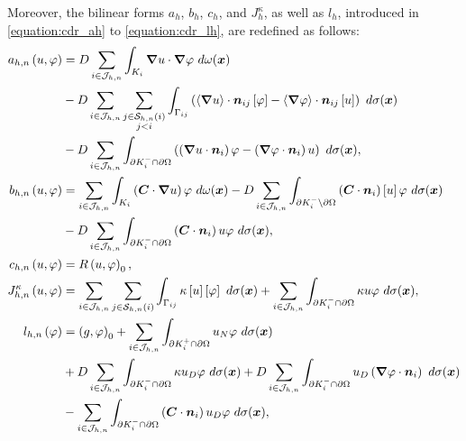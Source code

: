 Moreover, the bilinear forms $a_h$, $b_h$, $c_h$, and $J^{\kappa}_h$, as well as $l_h$, introduced in \eqref{equation:cdr_ah} to \eqref{equation:cdr_lh}, are redefined as follows:
\begin{align}
    a_{h, n} \left( u, \varphi \right) &= D \sum_{i \in \mathcal{J}_{h, n}} \int_{K_i} \bm{\nabla} u \cdot \bm{\nabla} \varphi ~ d \omega(\bm{x}) \label{equation:cdr_ahn} \\
    &- D \sum_{i \in \mathcal{J}_{h, n}} \sum_{\substack{j \in \mathcal{S}_{h, n}(i) \\ j < i}} \int_{\Gamma_{ij}} \left( \left\langle \bm{\nabla} u \right\rangle \cdot \bm{n}_{ij} \left[ \varphi \right] - \left\langle \bm{\nabla} \varphi \right\rangle \cdot \bm{n}_{ij} \left[ u \right] \right) ~ d \sigma(\bm{x}) \notag \\
    &- D \sum_{i \in \mathcal{J}_{h, n}} \int_{\partial K_i^- \cap \partial \Omega} \left( \left( \bm{\nabla} u \cdot \bm{n}_i \right) \varphi - \left( \bm{\nabla} \varphi \cdot \bm{n}_i \right) u \right) ~ d \sigma(\bm{x}), \notag \\
    b_{h, n} \left( u, \varphi \right) &= \sum_{i \in \mathcal{J}_{h, n}} \int_{K_i} \left( \bm{C} \cdot \bm{\nabla} u \right) \varphi ~ d \omega(\bm{x}) \label{equation:cdr_bhn} - D \sum_{i \in \mathcal{J}_{h, n}} \int_{\partial K_i^- \setminus \partial \Omega} \left( \bm{C} \cdot \bm{n}_i \right) \left[ u \right] \varphi ~ d \sigma(\bm{x}) \\
    &- D \sum_{i \in \mathcal{J}_{h, n}} \int_{\partial K_i^- \cap \partial \Omega} \left( \bm{C} \cdot \bm{n}_i \right) u \varphi ~ d \sigma(\bm{x}), \notag \\
    c_{h, n} \left( u, \varphi \right) &= R \left( u, \varphi \right)_0, \label{equation:cdr_chn} \\
    J^{\kappa}_{h, n} \left( u, \varphi \right) &= \sum_{i \in \mathcal{J}_{h, n}} \sum_{j \in \mathcal{S}_{h, n}(i)} \int_{\Gamma_{ij}} \kappa \left[ u \right] \left[ \varphi \right] ~ d \sigma(\bm{x}) + \sum_{i \in \mathcal{J}_{h, n}} \int_{\partial K_i^- \cap \partial \Omega} \kappa u \varphi ~ d \sigma(\bm{x}), \label{equation:cdr_jhn} \\
    l_{h, n} \left( \varphi \right)  &= \left( g, \varphi \right)_0 + \sum_{i \in \mathcal{J}_{h, n}} \int_{\partial K_i^+ \cap \partial \Omega} u_N \varphi ~ d \sigma(\bm{x}) \label{equation:cdr_lhn} \\
    &+ D \sum_{i \in \mathcal{J}_{h, n}} \int_{\partial K_i^- \cap \partial \Omega} \kappa u_D \varphi ~ d \sigma(\bm{x}) + D \sum_{i \in \mathcal{J}_{h, n}} \int_{\partial K_i^- \cap \partial \Omega} u_D \left( \bm{\nabla} \varphi \cdot \bm{n}_i \right) ~ d \sigma(\bm{x}) \notag \\
    &- \sum_{i \in \mathcal{J}_{h, n}} \int_{\partial K_i^- \cap \partial \Omega} \left( \bm{C} \cdot \bm{n}_i \right) u_D \varphi ~ d \sigma(\bm{x}) \notag,
\end{align}
